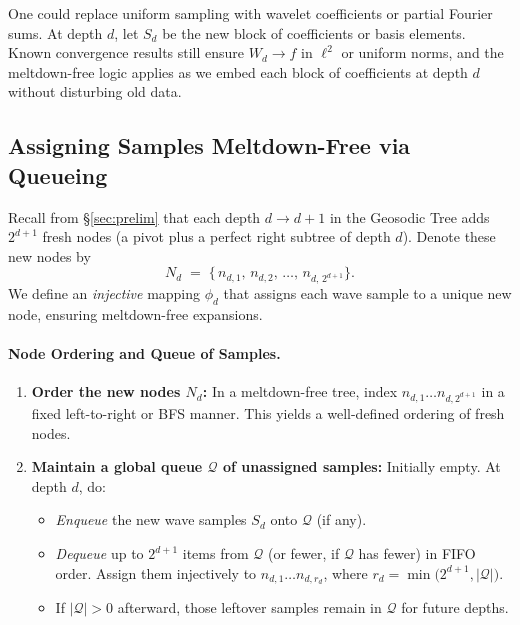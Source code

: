 \begin{remark}
  \label{rem:wavelets-fourier}
  One could replace uniform sampling with wavelet coefficients or partial
  Fourier sums. At depth $d$, let $S_d$ be the new block of coefficients
  or basis elements. Known convergence results still ensure $W_d \to f$ in
  $\ell^2$ or uniform norms, and the meltdown-free logic applies as we embed
  each block of coefficients at depth $d$ without disturbing old data.
\end{remark}

\subsection{Assigning Samples Meltdown-Free via Queueing}
\label{subsec:wave-embedding}

Recall from \S\ref{sec:prelim} that each depth $d\to d+1$ in the Geosodic Tree
adds $2^{d+1}$ fresh nodes (a pivot plus a perfect right subtree of depth $d$).
Denote these new nodes by
\[
  N_d \;=\;
  \{\,n_{d,1},\,n_{d,2},\,\dots,\,n_{d,\,2^{d+1}}\}.
\]
We define an \emph{injective} mapping $\phi_d$ that assigns each wave sample
to a unique new node, ensuring meltdown-free expansions.

\paragraph{Node Ordering and Queue of Samples.}
\begin{enumerate}
  \item \textbf{Order the new nodes $N_d$:}  
    In a meltdown-free tree, index $n_{d,1}\dots n_{d,2^{d+1}}$ in a fixed
    left-to-right or BFS manner. This yields a well-defined ordering of fresh nodes.
  \item \textbf{Maintain a global queue $\mathcal{Q}$ of unassigned samples:}  
    Initially empty. At depth $d$, do:
    \begin{itemize}
      \item \emph{Enqueue} the new wave samples $S_d$ onto $\mathcal{Q}$ (if any).
      \item \emph{Dequeue} up to $2^{d+1}$ items from $\mathcal{Q}$ (or fewer, if $\mathcal{Q}$ has fewer)
            in FIFO order. Assign them injectively to $n_{d,1}\dots n_{d,r_d}$, where
            $r_d = \min\bigl(2^{d+1}, \lvert\mathcal{Q}\rvert\bigr)$.  
      \item If $\lvert\mathcal{Q}\rvert > 0$ afterward, those leftover samples remain
            in $\mathcal{Q}$ for future depths.
    \end{itemize}
\end{enumerate}

